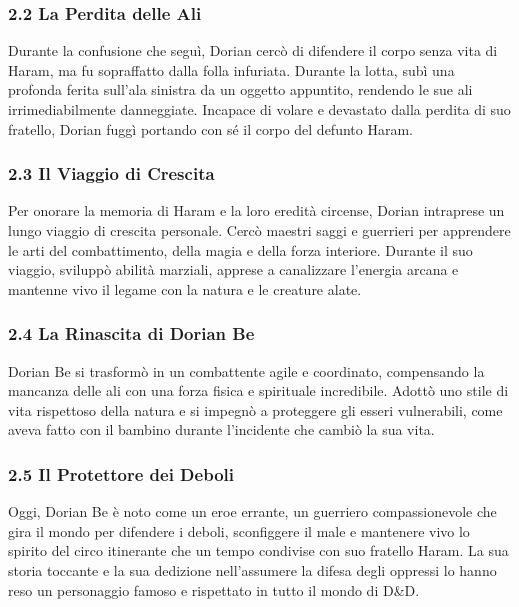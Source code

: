 \subsubsection{\texorpdfstring{2.2 \textbf{La Perdita delle
Ali}}{2.2 La Perdita delle Ali}}\label{la-perdita-delle-ali}

Durante la confusione che seguì, Dorian cercò di difendere il corpo
senza vita di Haram, ma fu sopraffatto dalla folla infuriata. Durante la
lotta, subì una profonda ferita sull'ala sinistra da un oggetto
appuntito, rendendo le sue ali irrimediabilmente danneggiate. Incapace
di volare e devastato dalla perdita di suo fratello, Dorian fuggì
portando con sé il corpo del defunto Haram.

\subsubsection{\texorpdfstring{2.3 \textbf{Il Viaggio di
Crescita}}{2.3 Il Viaggio di Crescita}}\label{il-viaggio-di-crescita}

Per onorare la memoria di Haram e la loro eredità circense, Dorian
intraprese un lungo viaggio di crescita personale. Cercò maestri saggi e
guerrieri per apprendere le arti del combattimento, della magia e della
forza interiore. Durante il suo viaggio, sviluppò abilità marziali,
apprese a canalizzare l'energia arcana e mantenne vivo il legame con la
natura e le creature alate.

\subsubsection{\texorpdfstring{2.4 \textbf{La Rinascita di Dorian
Be}}{2.4 La Rinascita di Dorian Be}}\label{la-rinascita-di-dorian-be}

Dorian Be si trasformò in un combattente agile e coordinato, compensando
la mancanza delle ali con una forza fisica e spirituale incredibile.
Adottò uno stile di vita rispettoso della natura e si impegnò a
proteggere gli esseri vulnerabili, come aveva fatto con il bambino
durante l'incidente che cambiò la sua vita.

\subsubsection{\texorpdfstring{2.5 \textbf{Il Protettore dei
Deboli}}{2.5 Il Protettore dei Deboli}}\label{il-protettore-dei-deboli}

Oggi, Dorian Be è noto come un eroe errante, un guerriero
compassionevole che gira il mondo per difendere i deboli, sconfiggere il
male e mantenere vivo lo spirito del circo itinerante che un tempo
condivise con suo fratello Haram. La sua storia toccante e la sua
dedizione nell'assumere la difesa degli oppressi lo hanno reso un
personaggio famoso e rispettato in tutto il mondo di D\&D.

